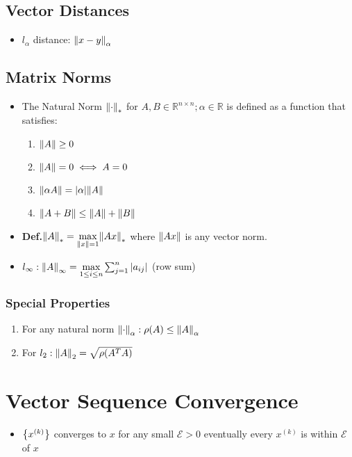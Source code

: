 \documentclass[8pt, letterpaper]{extarticle}
\newcommand{\bigEps}{\mathcal{E}}
\newcommand{\defn}{\textbf{Def.}\xspace}
\begin{document}
\begin{multicols*}{3}
  \subsection{Vector Distances}
  \begin{itemize}
    \item $l_\alpha$ distance: $\norm{x-y}_\alpha$
  \end{itemize}

  \subsection{Matrix Norms}
  \begin{itemize}
    \item The Natural Norm $\norm{\cdot}_*$ for $A, B \in \mathbb{R}^{n \times n};
      \alpha \in \mathbb{R}$ is defined as a function that satisfies:
      \begin{enumerate}
        \item $\norm{A} \geq 0$
        \item $\norm{A} = 0 \iff A = 0$
        \item $\norm{\alpha A} = \abs{\alpha} \norm{A}$
        \item $\norm{A + B} \leq \norm{A} + \norm{B}$
      \end{enumerate}
    \item \defn $\norm{A}_* = \underset{\|x\| = 1}{\max} \norm{Ax}_*$ where
      $\norm{Ax}$ is any vector norm.
    \item $l_\infty : \norm{A}_\infty = \underset{1 \leq i \leq n}{\max}
      \sum_{j=1}^{n} \abs{a_{ij}}$ (row sum)
  \end{itemize}
  \subsubsection{Special Properties}
  \begin{enumerate}
    \item For any natural norm $\norm{\cdot}_\alpha:\rho(A) \leq \norm{A}_\alpha$
    \item For $l_2:\norm{A}_2 = \sqrt{\rho(A^TA)}$
  \end{enumerate}

  \section{Vector Sequence Convergence}
  \begin{itemize}
    \item $\Bqty{x^{(k)}}$ converges to $x$ for any small $\bigEps > 0$
      eventually every $x^{(k)}$ is within $\bigEps$ of $x$
  \end{itemize}


\end{multicols*}
\end{document}
